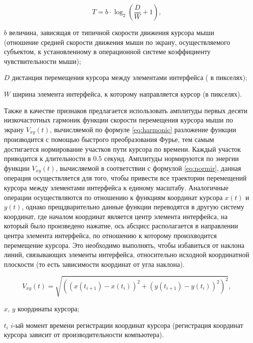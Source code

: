 \begin{equation}
\label{eq:fitts}
T = b \cdot \log_{2}\left(\frac{D}{W} + 1\right),
\end{equation}

\begin{eqexpl}[15mm]
\item{$b$} величина, зависящая от типичной скорости движения курсора мыши (отношение средней скорости движения мыши по экрану, осуществляемого субъектом, к установленному в операционной системе коэффициенту чувствительности мыши);
\item{$D$} дистанция перемещения курсора между элементами интерфейса ( в пикселях);
\item{$W$} ширина элемента интерфейса, к которому направляется курсор (в пикселях).
\end{eqexpl}

Также в качестве признаков предлагается использовать амплитуды первых десяти низкочастотных гармоник функции скорости перемещения курсора мыши по экрану $V_{xy}(t)$, вычисляемой по формуле \ref{eq:harmonic} разложение функции производится с помощью быстрого преобразования Фурье, тем самым достигается нормирование участков пути курсора по времени. Каждый участок приводится к длительности в $0.5$ секунд. Амплитуды нормируются по энергии функции $V_{xy}(t)$, вычисляемой в соответствии с формулой \ref{eq:normir}, данная операция осуществляется для того, чтобы привести все траектории перемещений курсора между элементами интерфейса к единому масштабу. Аналогичные операции осуществляются по отношению к функциям координат курсора $x(t)$ и $y(t)$, однако прещдварительно данные функции переводятся в другую систему координат, где началом координат является центр элемента интерфейса, на который было произведено нажатие, ось абсцисс располагается в направлении центра элемента интерфейса, по отношению к которому произхводится перемещение курсора. Это необходимо выполнять, чтобы избавиться от наклона линий, связывающих элементы интерфейса, относительно исходной координатной плоскости (то есть зависимости координат от угла наклона). \cite{mouseMethod}

\begin{equation}
\label{eq:harmonic}
V_{xy}(t) = \sqrt{((x(t_{i+1}) - x(t_i))^2 + (y(t_{i+1})-y(t_i))^2)^2},
\end{equation}

\begin{eqexpl}[15mm]
\item{$x$, $y$} координаты курсора;
\item{$t_i$} $i$-ый момент времени регистрации координат курсора (регистрация координат курсора зависит от производительности компьютера).
\end{eqexpl}

